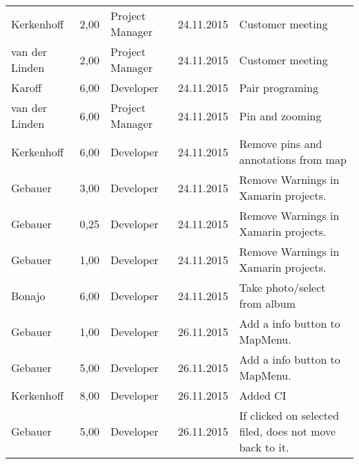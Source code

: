 \begin{longtable}{ l r p{2cm} c p{4cm} }
		Kerkenhoff              & 2,00           & Project Manager       & 24.11.2015    & Customer meeting                                                                 \\
		van der Linden          & 2,00           & Project Manager       & 24.11.2015    & Customer meeting                                                                 \\
		Karoff                  & 6,00           & Developer             & 24.11.2015    & Pair programing                                                                  \\
		van der Linden          & 6,00           & Project Manager       & 24.11.2015    & Pin and zooming                                                                 \\
		Kerkenhoff              & 6,00           & Developer             & 24.11.2015    & Remove pins and annotations from map                                            \\
		Gebauer                 & 3,00           & Developer             & 24.11.2015    & Remove Warnings in Xamarin projects.                                            \\
		Gebauer                 & 0,25           & Developer             & 24.11.2015    & Remove Warnings in Xamarin projects.                                            \\
		Gebauer                 & 1,00           & Developer             & 24.11.2015    & Remove Warnings in Xamarin projects.                                            \\
		Bonajo                  & 6,00           & Developer             & 24.11.2015    & Take photo/select from album                                                    \\
		Gebauer                 & 1,00           & Developer             & 26.11.2015    & Add a info button to MapMenu.                                                   \\
		Gebauer                 & 5,00           & Developer             & 26.11.2015    & Add a info button to MapMenu.                                                   \\
		Kerkenhoff              & 8,00           & Developer             & 26.11.2015    & Added CI                                                                        \\
		Gebauer                 & 5,00           & Developer             & 26.11.2015    & If clicked on selected filed, does not move back to it.                         \\

\end{longtable}
